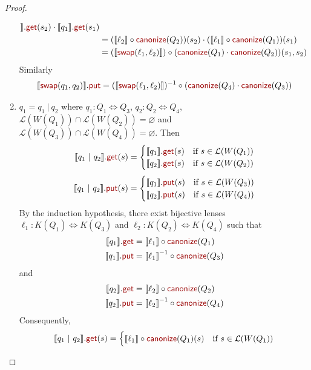 \documentclass[acmsmall,review,anonymous]{acmart}
\newcommand{\kw}[1]{\textcolor{dkred}{\ensuremath{\mathsf{#1}}}}
\newcommand{\sep}{\ensuremath{\ | \ }}
\newcommand{\canonize}{\ensuremath{\kw{canonize}}}
\newcommand{\get}{\ensuremath{\kw{get}}}
\newcommand{\lput}{\ensuremath{\kw{put}}}
\newcommand{\swap}{\ensuremath{\kw{swap}}}
\begin{document}
\begin{proof}
\begin{enumerate}
\begin{align*}
\rrbracket.\get(s_2) \cdot \llbracket q_1 \rrbracket.\get(s_1)\\
&= (\llbracket \ell_2 \rrbracket \circ
\canonize(Q_2))(s_2) \cdot  (\llbracket \ell_1 \rrbracket \circ
\canonize(Q_1))(s_1)\\
&= (\llbracket \swap(\ell_1, \ell_2) \rrbracket) \circ (\canonize(Q_1) \cdot
\canonize(Q_2)) (s_1, s_2)
\end{align*}
Similarly
$$
\llbracket \swap(q_1, q_2) \rrbracket.\lput = (\llbracket \swap(\ell_1, \ell_2)
\rrbracket)^{-1} \circ (\canonize(Q_4) \cdot \canonize(Q_3))$$
\item
$q_1 = q_1 \sep q_2$ where $q_1 : Q_1 \Leftrightarrow Q_3 $, $q_2 : Q_2
\Leftrightarrow Q_4$, $\mathcal{L}(W(Q_1)) \cap \mathcal{L}(W(Q_2)) =
\varnothing$ and $\mathcal{L}(W(Q_3)) \cap \mathcal{L}(W(Q_4)) = \varnothing$.
Then
$$
\llbracket q_1 \sep q_2 \rrbracket.\get(s) =
\begin{cases}
\llbracket q_1 \rrbracket.\get (s) & \text{if } s \in \mathcal{L}(W(Q_1))\\
\llbracket q_2 \rrbracket.\get (s) & \text{if } s \in \mathcal{L}(W(Q_2))\\
\end{cases}$$
$$\llbracket q_1 \sep q_2 \rrbracket.\lput(s) =
\begin{cases}
\llbracket q_1 \rrbracket.\lput (s) & \text{if } s \in \mathcal{L}(W(Q_3))\\
\llbracket q_2 \rrbracket.\lput (s) & \text{if } s \in \mathcal{L}(W(Q_4))\\
\end{cases}
$$
By the induction hypothesis, there exist bijective lenses $\ell_1 : K(Q_1)
\Leftrightarrow K(Q_3)$ and $\ell_2 : K(Q_2) \Leftrightarrow K(Q_4)$ such that
\begin{align*}
\llbracket q_1 \rrbracket.\get &= \llbracket \ell_1 \rrbracket \circ
\canonize(Q_1)\\
\llbracket q_1 \rrbracket.\lput &= {\llbracket \ell_1 \rrbracket}^{-1} \circ
\canonize(Q_3)
\end{align*}
and
\begin{align*}
\llbracket q_2 \rrbracket.\get &= \llbracket \ell_2 \rrbracket \circ
\canonize(Q_2)\\
\llbracket q_2 \rrbracket.\lput &= {\llbracket \ell_2 \rrbracket}^{-1} \circ
\canonize(Q_4)
\end{align*}
Consequently,
$$
\llbracket q_1 \sep q_2 \rrbracket.\get(s) =
\begin{cases}
\llbracket \ell_1 \rrbracket \circ
\canonize(Q_1) (s) & \text{if } s \in \mathcal{L}(W(Q_1))\\

\end{cases}$$
\end{enumerate}
\end{proof}
\end{document}

